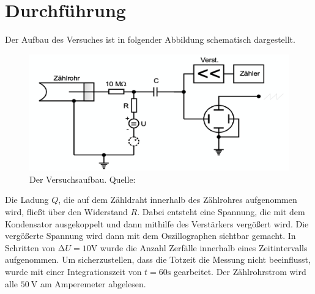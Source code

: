 \section{Durchführung}
\label{sec:Durchführung}
Der Aufbau des Versuches ist in folgender Abbildung schematisch dargestellt.
  \begin{figure}[H]
    \centering
      \includegraphics[scale=0.6]{content/AufbauV703.png}
      \caption{Der Versuchsaufbau. Quelle:\cite{AP01}}
      \label{fig:aufbau3}
  \end{figure}
\label{sec:Durchführung}
\noindent
Die Ladung $Q$, die auf dem Zähldraht innerhalb des Zählrohres aufgenommen wird, fließt über den
Widerstand $R$. Dabei entsteht eine Spannung, die mit dem Kondensator ausgekoppelt und dann mithilfe
des Verstärkers vergößert wird. Die vergößerte Spannung wird dann mit dem Oszillographen sichtbar
gemacht. In Schritten von $\increment U = 10 \si{\volt}$ wurde die Anzahl Zerfälle innerhalb eines
Zeitintervalls aufgenommen. Um sicherzustellen, dass die Totzeit die Messung nicht beeinflusst,
wurde mit einer Integrationszeit von $t = 60 \si{\second}$ gearbeitet. Der Zählrohrstrom wird alle
$\SI{50}{\volt}$ am Amperemeter abgelesen. 
